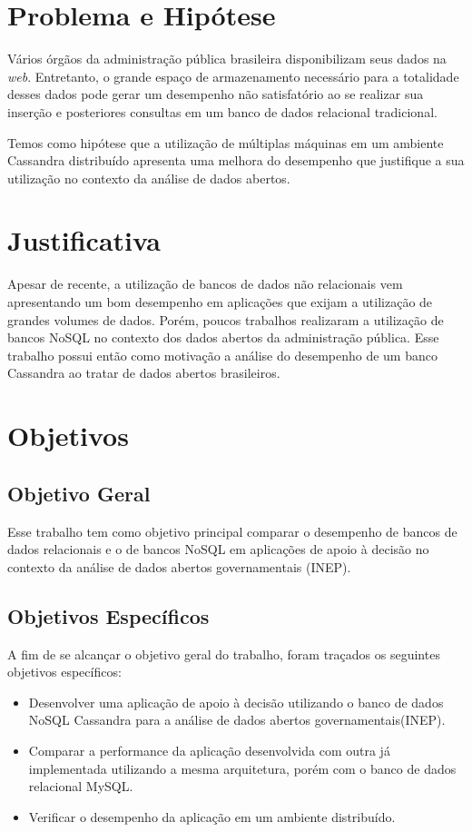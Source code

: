 \section{Problema e Hipótese}
Vários órgãos da administração pública brasileira disponibilizam seus dados na \emph{web}. Entretanto, o grande espaço de armazenamento necessário para a totalidade desses dados pode gerar um desempenho não satisfatório ao se realizar sua inserção e posteriores consultas em um banco de dados relacional tradicional.

Temos como hipótese que a utilização de múltiplas máquinas em um ambiente Cassandra distribuído apresenta uma melhora do desempenho que justifique a sua utilização no contexto da análise de dados abertos.

\section{Justificativa}
Apesar de recente, a utilização de bancos de dados não relacionais vem apresentando um bom desempenho em aplicações que exijam a utilização de grandes volumes de dados. Porém, poucos trabalhos realizaram a utilização de bancos NoSQL no contexto dos dados abertos da administração pública. Esse trabalho possui então como motivação a análise do desempenho de um banco Cassandra ao tratar de dados abertos brasileiros.

\section{Objetivos}

\subsection{Objetivo Geral}
Esse trabalho tem como objetivo principal comparar o desempenho de bancos de dados relacionais e o de bancos NoSQL em aplicações de apoio à decisão no contexto da análise de dados abertos governamentais (INEP).

\subsection{Objetivos Específicos}
A fim de se alcançar o objetivo geral do trabalho, foram traçados os seguintes objetivos específicos:
\begin{itemize}
		\item Desenvolver uma aplicação de apoio à decisão utilizando o banco de dados NoSQL Cassandra para a análise de dados abertos governamentais(INEP).
		
		\item Comparar a performance da aplicação desenvolvida com outra já implementada utilizando a mesma arquitetura, porém com o banco de dados relacional MySQL.
		
		\item Verificar o desempenho da aplicação em um ambiente distribuído.
\end{itemize}

